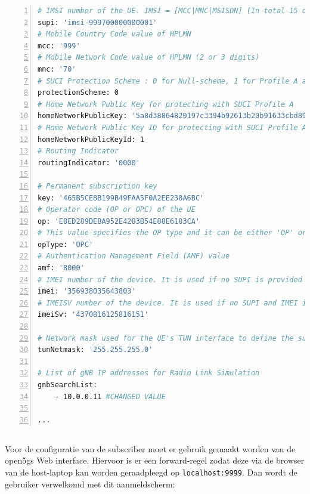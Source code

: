 \begin{lstlisting}[basicstyle=\small, frame=single, breaklines=true, postbreak=\mbox{\textcolor{red}{$\hookrightarrow$}\space}, escapeinside ={\%,}, escapechar={!}, numbers=left, language=sh, caption=UE configuratie]
# IMSI number of the UE. IMSI = [MCC|MNC|MSISDN] (In total 15 digits)
supi: 'imsi-999700000000001'
# Mobile Country Code value of HPLMN
mcc: '999'
# Mobile Network Code value of HPLMN (2 or 3 digits)
mnc: '70'
# SUCI Protection Scheme : 0 for Null-scheme, 1 for Profile A and 2 for Profile B
protectionScheme: 0
# Home Network Public Key for protecting with SUCI Profile A
homeNetworkPublicKey: '5a8d38864820197c3394b92613b20b91633cbd897119273bf8e4a6f4eec0a650'
# Home Network Public Key ID for protecting with SUCI Profile A
homeNetworkPublicKeyId: 1
# Routing Indicator
routingIndicator: '0000'

# Permanent subscription key
key: '465B5CE8B199B49FAA5F0A2EE238A6BC'
# Operator code (OP or OPC) of the UE
op: 'E8ED289DEBA952E4283B54E88E6183CA'
# This value specifies the OP type and it can be either 'OP' or 'OPC'
opType: 'OPC'
# Authentication Management Field (AMF) value
amf: '8000'
# IMEI number of the device. It is used if no SUPI is provided
imei: '356938035643803'
# IMEISV number of the device. It is used if no SUPI and IMEI is provided
imeiSv: '4370816125816151'

# Network mask used for the UE's TUN interface to define the subnet size
tunNetmask: '255.255.255.0'

# List of gNB IP addresses for Radio Link Simulation
gnbSearchList:
    - 10.0.0.11 #CHANGED VALUE

...
\end{lstlisting}

\subsection{}%
\label{sec:subscriber_config}%

Voor de configuratie van de subscriber moet er gebruik gemaakt worden van de \gls{open5gs} Web interface. Hiervoor is er een forward-regel zodat deze via de browser van de host-laptop kan worden geraadpleegd op \lstinline!localhost:9999!. Dan wordt de gebruiker verwelkomd met dit aanmeldscherm:

